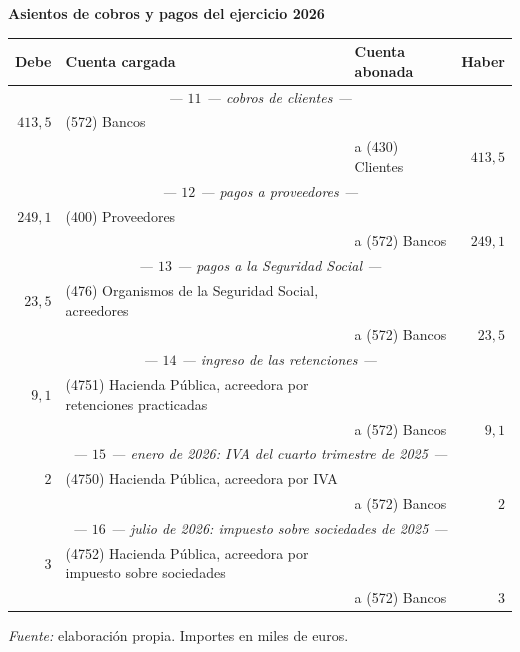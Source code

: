 \documentclass[10pt,a4paper]{article}
\begin{document}
\begin{center}\begin{minipage}{\linewidth}\centering
{\small\textbf{Asientos de cobros y pagos del ejercicio 2026}}\par\vspace{0.3em}
{\small
\begin{tabular}{r p{5.6cm} p{6.4cm} r}
\hline
\textbf{Debe} & \textbf{Cuenta cargada} & \textbf{Cuenta abonada} & \textbf{Haber} \\
\hline
\multicolumn{4}{c}{\textit{--- $11$ --- cobros de clientes ---}} \\
$413,5$ & (572) Bancos & & \\
 & & \raggedright a (430) Clientes & $413,5$ \\
\multicolumn{4}{c}{\textit{--- $12$ --- pagos a proveedores ---}} \\
$249,1$ & (400) Proveedores & & \\
 & & \raggedright a (572) Bancos & $249,1$ \\
\multicolumn{4}{c}{\textit{--- $13$ --- pagos a la Seguridad Social ---}} \\
$23,5$ & \raggedright (476) Organismos de la Seguridad Social, acreedores & & \\
 & & \raggedright a (572) Bancos & $23,5$ \\
\multicolumn{4}{c}{\textit{--- $14$ --- ingreso de las retenciones ---}} \\
$9,1$ & \raggedright (4751) Hacienda Pública, acreedora por retenciones practicadas & & \\
 & & \raggedright a (572) Bancos & $9,1$ \\
\multicolumn{4}{c}{\textit{--- $15$ --- enero de 2026: IVA del cuarto trimestre de 2025 ---}} \\
$2$ & \raggedright (4750) Hacienda Pública, acreedora por IVA & & \\
 & & \raggedright a (572) Bancos & $2$ \\
\multicolumn{4}{c}{\textit{--- $16$ --- julio de 2026: impuesto sobre sociedades de 2025 ---}} \\
$3$ & \raggedright (4752) Hacienda Pública, acreedora por impuesto sobre sociedades & & \\
 & & \raggedright a (572) Bancos & $3$ \\
\hline
\end{tabular}}\par\vspace{0.3em}
{\small\textit{Fuente: }elaboración propia. Importes en miles de euros.}
\end{minipage}\end{center}
\end{document}

